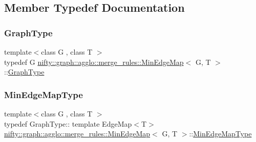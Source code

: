 \subsection{Member Typedef Documentation}
\mbox{\label{classnifty_1_1graph_1_1agglo_1_1merge__rules_1_1MinEdgeMap_aad794908266d5bf105eea1c117ffb70f}} 
\subsubsection{\texorpdfstring{Graph\+Type}{GraphType}}
{\footnotesize\ttfamily template$<$class G , class T $>$ \\
typedef G \hyperlink{classnifty_1_1graph_1_1agglo_1_1merge__rules_1_1MinEdgeMap}{nifty\+::graph\+::agglo\+::merge\+\_\+rules\+::\+Min\+Edge\+Map}$<$ G, T $>$\+::\hyperlink{classnifty_1_1graph_1_1agglo_1_1merge__rules_1_1MinEdgeMap_aad794908266d5bf105eea1c117ffb70f}{Graph\+Type}}

\mbox{\label{classnifty_1_1graph_1_1agglo_1_1merge__rules_1_1MinEdgeMap_ab5ce11aa4046c0cdd9d99e934db91fac}} 
\subsubsection{\texorpdfstring{Min\+Edge\+Map\+Type}{MinEdgeMapType}}
{\footnotesize\ttfamily template$<$class G , class T $>$ \\
typedef Graph\+Type\+:: template Edge\+Map$<$T$>$ \hyperlink{classnifty_1_1graph_1_1agglo_1_1merge__rules_1_1MinEdgeMap}{nifty\+::graph\+::agglo\+::merge\+\_\+rules\+::\+Min\+Edge\+Map}$<$ G, T $>$\+::\hyperlink{classnifty_1_1graph_1_1agglo_1_1merge__rules_1_1MinEdgeMap_ab5ce11aa4046c0cdd9d99e934db91fac}{Min\+Edge\+Map\+Type}}

